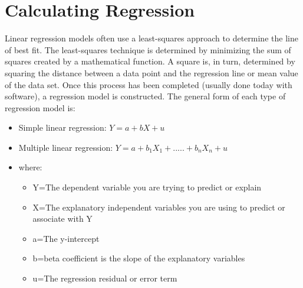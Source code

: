 \section{Calculating Regression}
    Linear regression models often use a least-squares approach to determine the line of best fit. The least-squares technique is determined by minimizing the sum of squares created by a mathematical function. A square is, in turn, determined by squaring the distance between a data point and the regression line or mean value of the data set.
    Once this process has been completed (usually done today with software), a regression model is constructed. The general form of each type of regression model is:
    \begin{itemize}
        \item Simple linear regression: $Y = a + bX + u$
        \item Multiple linear regression: $Y = a + b_1X_1 + ..... + b_nX_n + u$
        \item where:
        \begin{itemize}
            \item Y=The dependent variable you are trying to predict or explain
            \item X=The explanatory independent variables you are using to predict or associate with Y
            \item a=The y-intercept
            \item b=beta coefficient is the slope of the explanatory variables
            \item u=The regression residual or error term 
        \end{itemize}
    \end{itemize}  